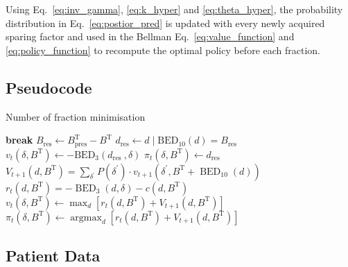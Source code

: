 \documentclass[\relativeRoot/ada.tex]{subfiles}
\begin{document}
Using Eq.~\eqref{eq:inv_gamma}, \eqref{eq:k_hyper} and \eqref{eq:theta_hyper}, the probability distribution in Eq.~\eqref{eq:postior_pred} is updated with every newly acquired sparing factor and used in the Bellman Eq.~\eqref{eq:value_function} and \eqref{eq:policy_function} to recompute the optimal policy before each fraction.






\onecolumn
\newpage
\clearpage
\pagestyle{empty}

\subsection{Pseudocode}\label{sec:pseudocode}

\begin{algorithm}[!htb]
    \caption{Number of fraction minimisation}
    \begin{algorithmic}
         
         
            \State \textbf{break}
            \State $B_{\text{res}} \gets B_{\text{pres}}^\text{T} - B^\text{T}$ 
            \State $d_{\text{res}} \gets d \mid \mathrm{BED}_{10}(d)=B_{\text{res}}$ 
            \State $v_t \left(\delta, B^{\text{T}}\right) \leftarrow-\mathrm{BED}_{3}\left(d_{\text {res }}, \delta\right)$ 
            \State $\pi_t \left(\delta, B^{\text{T}}\right) \leftarrow d_{\text {res }}$ 
        \Else
            \State $V_{t+1}\left(d, B^{\text{T}}\right) = \sum_{\delta^{\prime}} P(\delta^{\prime}) \cdot v_{t+1}\left(\delta^{\prime}, B^{\text{T}}+\operatorname{BED}_{10}(d)\right)$ 
            \State $r_{t}\left(d, B^{\text{T}}\right) = -\operatorname{BED}_{3}(d, \delta) - c(d, B^{\text{T}})$ 
            \State $v_t \left(\delta, B^{\text{T}}\right) \gets \max _{d}\left[ r_t(d, B^{\text{T}}) + V_{t+1}(d, B^{\text{T}})\right]$ 
            \State $\pi_t \left(\delta, B^{\text{T}}\right) \gets \operatorname{argmax}_{d}\left[r_t(d, B^{\text{T}}) + V_{t+1}(d, B^{\text{T}}) \right]$
        \EndIf
        \EndFor
    \end{algorithmic}
\end{algorithm}



\subsection{Patient Data}

    
\end{document}
